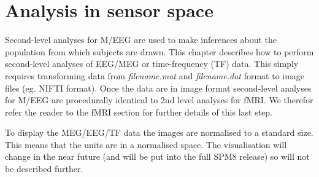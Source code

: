 \chapter{Analysis in sensor space \label{Chap:eeg:sensoranalysis}}

Second-level analyses for M/EEG are used to make inferences about the population from which subjects are drawn. This chapter describes how to perform second-level analyses of EEG/MEG or time-frequency (TF) data. This simply requires transforming data from \textit{filename.mat} and \textit{filename.dat}
format to image files (eg. NIFTI format). Once the data are in image format second-level analyses for M/EEG are procedurally identical to 2nd level analyses for fMRI.
We therefor refer the reader to the fMRI section for further details of this last step.

To display the MEG/EEG/TF data the images are normalised to a standard size. This means that the units are in a normalised space. The visualisation will change in the near future (and will be put into the full SPM8 release) so will not be described further.

